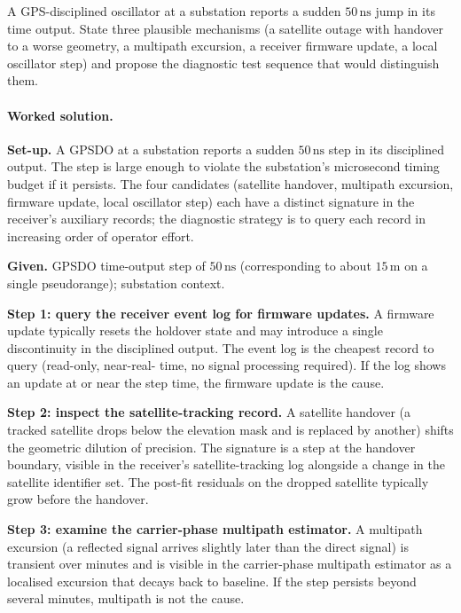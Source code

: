 \begin{exercise}
A GPS-disciplined oscillator at a substation reports a sudden
$50 \,\si{\nano\second}$ jump in its time output. State three
plausible mechanisms (a satellite outage with handover to a worse
geometry, a multipath excursion, a receiver firmware update, a
local oscillator step) and propose the diagnostic test sequence
that would distinguish them.

\paragraph{Worked solution.}
\textbf{Set-up.} A GPSDO at a substation reports a sudden $50 \,\si
{\nano\second}$ step in its disciplined output. The step is large
enough to violate the substation's microsecond timing budget if it
persists. The four candidates (satellite handover, multipath
excursion, firmware update, local oscillator step) each have a
distinct signature in the receiver's auxiliary records; the
diagnostic strategy is to query each record in increasing order
of operator effort.

\textbf{Given.} GPSDO time-output step of $50 \,\si{\nano\second}$
(corresponding to about $15 \,\si{\meter}$ on a single
pseudorange); substation context.

\textbf{Step 1: query the receiver event log for firmware updates.}
A firmware update typically resets the holdover state and may
introduce a single discontinuity in the disciplined output. The
event log is the cheapest record to query (read-only, near-real-
time, no signal processing required). If the log shows an update
at or near the step time, the firmware update is the cause.

\textbf{Step 2: inspect the satellite-tracking record.} A
satellite handover (a tracked satellite drops below the elevation
mask and is replaced by another) shifts the geometric dilution
of precision. The signature is a step at the handover boundary,
visible in the receiver's satellite-tracking log alongside a
change in the satellite identifier set. The post-fit residuals
on the dropped satellite typically grow before the handover.

\textbf{Step 3: examine the carrier-phase multipath estimator.} A
multipath excursion (a reflected signal arrives slightly later
than the direct signal) is transient over minutes and is visible
in the carrier-phase multipath estimator as a localised
excursion that decays back to baseline. If the step persists
beyond several minutes, multipath is not the cause.


\end{exercise}

